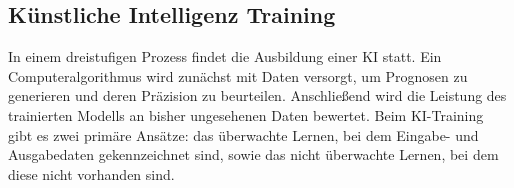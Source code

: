 \subsection{Künstliche Intelligenz Training}

In einem dreistufigen Prozess findet die Ausbildung einer KI statt.
Ein Computeralgorithmus wird zunächst mit Daten versorgt, um Prognosen zu generieren und deren Präzision zu beurteilen.
Anschließend wird die Leistung des trainierten Modells an bisher ungesehenen Daten bewertet.
Beim KI-Training gibt es zwei primäre Ansätze: das überwachte Lernen, bei dem Eingabe- und Ausgabedaten gekennzeichnet sind, sowie das nicht überwachte Lernen, bei dem diese nicht vorhanden sind. \citep{ai-training-cw}